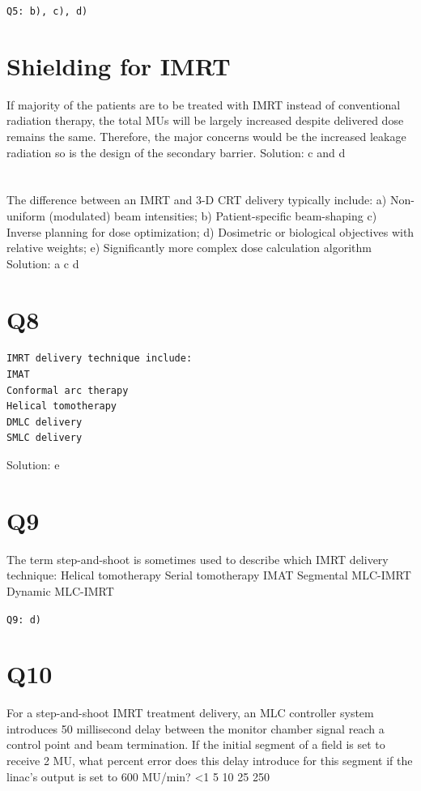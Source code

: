 \documentclass[]{book}
\theoremstyle{definition}
\theoremstyle{definition}
\theoremstyle{definition}
\theoremstyle{remark}
\begin{document}
\texttt{Q5:\ b),\ c),\ d)}

\section{Shielding for IMRT}\label{shielding-for-imrt}

If majority of the patients are to be treated with IMRT instead of
conventional radiation therapy, the total MUs will be largely increased
despite delivered dose remains the same. Therefore, the major concerns
would be the increased leakage radiation so is the design of the
secondary barrier. Solution: c and d

\section{}\label{section}

The difference between an IMRT and 3-D CRT delivery typically include:
a) Non-uniform (modulated) beam intensities; b) Patient-specific
beam-shaping c) Inverse planning for dose optimization; d) Dosimetric or
biological objectives with relative weights; e) Significantly more
complex dose calculation algorithm Solution: a c d

\section{Q8}\label{q8}

\begin{verbatim}
IMRT delivery technique include:
IMAT
Conformal arc therapy
Helical tomotherapy
DMLC delivery
SMLC delivery
\end{verbatim}

Solution: e

\section{Q9}\label{q9}

The term step-and-shoot is sometimes used to describe which IMRT
delivery technique: Helical tomotherapy Serial tomotherapy IMAT
Segmental MLC-IMRT Dynamic MLC-IMRT

\texttt{Q9:\ d)}

\section{Q10}\label{q10}

For a step-and-shoot IMRT treatment delivery, an MLC controller system
introduces 50 millisecond delay between the monitor chamber signal reach
a control point and beam termination. If the initial segment of a field
is set to receive 2 MU, what percent error does this delay introduce for
this segment if the linac's output is set to 600 MU/min? \textless{}1 5
10 25 250
\end{document}
